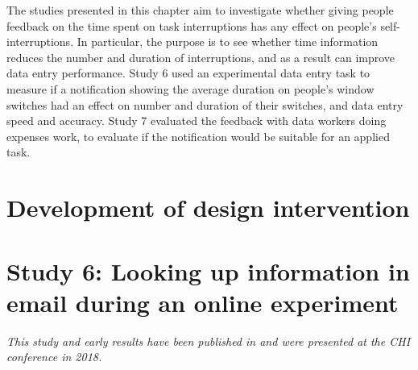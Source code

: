 The studies presented in this chapter aim to investigate whether giving people feedback on the time spent on task interruptions has any effect on people's self-interruptions. In particular, the purpose is to see whether time information reduces the number and duration of interruptions, and as a result can improve data entry performance. Study 6 used an experimental data entry task to measure if a notification showing the average duration on people's window switches had an effect on number and duration of their switches, and data entry speed and accuracy. Study 7 evaluated the feedback with data workers doing expenses work, to evaluate if the notification would be suitable for an applied task.

\section{Development of design intervention}

\section{Study 6: Looking up information in email during an online experiment}
\textit{This study and early results have been published in \citet{Borghouts2018a} and were presented at the CHI conference in 2018.}

